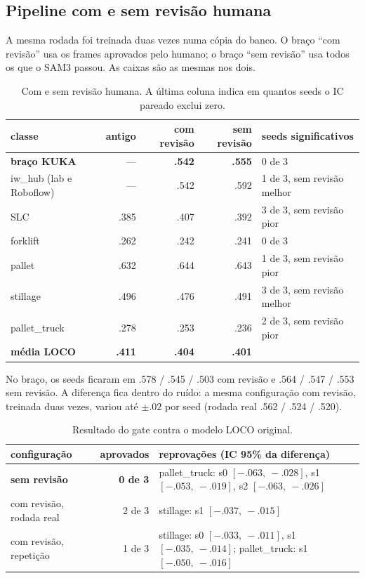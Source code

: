 \documentclass[11pt,a4paper]{article}
\begin{document}
\subsection{Pipeline com e sem revisão humana}
\label{sec:revisao}

A mesma rodada foi treinada duas vezes numa cópia do banco. O braço ``com
revisão'' usa os frames aprovados pelo humano; o braço ``sem revisão'' usa todos
os que o SAM3 passou. As caixas são as mesmas nos dois.

\begin{table}[H]
\centering\small
\caption{Com e sem revisão humana. A última coluna indica em quantos seeds o IC
pareado exclui zero.}
\label{tab:revisao}
\begin{tabular}{lrrrl}
\toprule
classe & antigo & com revisão & sem revisão & seeds significativos \\
\midrule
\textbf{braço KUKA} & --- & \textbf{.542} & \textbf{.555} & 0 de 3 \\
iw\_hub (lab e Roboflow) & --- & .542 & .592 & 1 de 3, sem revisão melhor \\
SLC & .385 & .407 & .392 & 3 de 3, sem revisão pior \\
forklift & .262 & .242 & .241 & 0 de 3 \\
pallet & .632 & .644 & .643 & 1 de 3, sem revisão pior \\
stillage & .496 & .476 & .491 & 3 de 3, sem revisão melhor \\
pallet\_truck & .278 & .253 & .236 & 2 de 3, sem revisão pior \\
\textbf{média LOCO} & \textbf{.411} & \textbf{.404} & \textbf{.401} & \\
\bottomrule
\end{tabular}
\end{table}

No braço, os seeds ficaram em .578 / .545 / .503 com revisão e .564 / .547 /
.553 sem revisão. A diferença fica dentro do ruído: a mesma configuração com
revisão, treinada duas vezes, variou até $\pm.02$ por seed (rodada real .562 /
.524 / .520).

\begin{table}[H]
\centering\small
\caption{Resultado do gate contra o modelo LOCO original.}
\label{tab:gate}
\begin{tabular}{lrp{8.4cm}}
\toprule
configuração & aprovados & reprovações (IC 95\% da diferença) \\
\midrule
\textbf{sem revisão} & \textbf{0 de 3} & pallet\_truck: s0 $[-.063,\ -.028]$, s1 $[-.053,\ -.019]$, s2 $[-.063,\ -.026]$ \\
com revisão, rodada real & 2 de 3 & stillage: s1 $[-.037,\ -.015]$ \\
com revisão, repetição & 1 de 3 & stillage: s0 $[-.033,\ -.011]$, s1 $[-.035,\ -.014]$; pallet\_truck: s1 $[-.050,\ -.016]$ \\
\bottomrule
\end{tabular}
\end{table}
\end{document}

